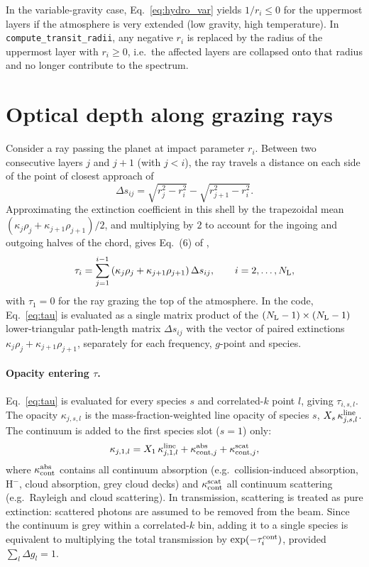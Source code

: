 \documentclass[11pt,a4paper]{article}
\newcommand{\Ntot}{N_{\rm L}}
\newcommand{\code}[1]{\texttt{#1}}
\begin{document}
In the variable-gravity case, Eq.~\eqref{eq:hydro_var} yields $1/r_i \le 0$
for the uppermost layers if the atmosphere is very extended (low gravity,
high temperature). In \code{compute\_transit\_radii}, any negative $r_i$ is
replaced by the radius of the uppermost layer with $r_i \ge 0$, i.e.\ the
affected layers are collapsed onto that radius and no longer contribute to
the spectrum.

\section{Optical depth along grazing rays}
\label{sec:tau}

Consider a ray passing the planet at impact parameter $r_i$. Between two
consecutive layers $j$ and $j+1$ (with $j < i$), the ray travels a distance
on each side of the point of closest approach of
\begin{equation}
  \Delta s_{ij} = \sqrt{r_j^2 - r_i^2} - \sqrt{r_{j+1}^2 - r_i^2} .
  \label{eq:ds}
\end{equation}
Approximating the extinction coefficient in this shell by the trapezoidal
mean $(\kappa_j\rho_j + \kappa_{j+1}\rho_{j+1})/2$, and multiplying by $2$ to
account for the ingoing and outgoing halves of the chord, gives Eq.~(6) of
\citet{molliere2019},
\begin{equation}
  \tau_i = \sum_{j=1}^{i-1}
  \left(\kappa_j\rho_j + \kappa_{j+1}\rho_{j+1}\right)\Delta s_{ij},
  \qquad i = 2,\dots,\Ntot,
  \label{eq:tau}
\end{equation}
with $\tau_1 = 0$ for the ray grazing the top of the atmosphere. In the
code, Eq.~\eqref{eq:tau} is evaluated as a single matrix product of the
$(\Ntot-1)\times(\Ntot-1)$ lower-triangular path-length matrix
$\Delta s_{ij}$ with the vector of paired extinctions
$\kappa_j\rho_j + \kappa_{j+1}\rho_{j+1}$, separately for each frequency,
$g$-point and species.

\paragraph{Opacity entering $\tau$.}
Eq.~\eqref{eq:tau} is evaluated for every species $s$ and correlated-$k$
point $l$, giving $\tau_{i,s,l}$. The opacity $\kappa_{j,s,l}$ is the
mass-fraction-weighted line opacity of species $s$, $X_s\,\kappa^{\rm line}_{j,s,l}$.
The continuum is added to the first species slot ($s=1$) only:
\begin{equation}
  \kappa_{j,1,l} = X_1\,\kappa^{\rm line}_{j,1,l}
  + \kappa^{\rm abs}_{{\rm cont},j} + \kappa^{\rm scat}_{{\rm cont},j},
\end{equation}
where $\kappa^{\rm abs}_{\rm cont}$ contains all continuum absorption (e.g.\
collision-induced absorption, H$^-$, cloud absorption, grey cloud decks)
and $\kappa^{\rm scat}_{\rm cont}$ all continuum scattering (e.g.\ Rayleigh
and cloud scattering). In transmission, scattering is treated as pure
extinction: scattered photons are assumed to be removed from the beam.
Since the continuum is grey within a correlated-$k$ bin, adding it to a
single species is equivalent to multiplying the total transmission by
$\exp(-\tau^{\rm cont}_i)$, provided $\sum_l \Delta g_l = 1$.
\end{document}
